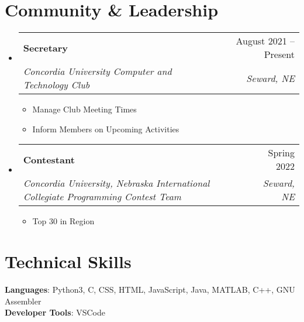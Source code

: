 \documentclass[letterpaper,11pt]{article}
\makeatletter
\newcommand{\resumeItem}[1]{
  \item\small{
    {#1 \vspace{-2pt}}
  }
}
\newcommand{\resumeSubheading}[4]{
  \vspace{-2pt}\item
    \begin{tabular*}{0.97\textwidth}[t]{l@{\extracolsep{\fill}}r}
      \textbf{#1} & #2 \\
      \textit{\small#3} & \textit{\small #4} \\
    \end{tabular*}\vspace{-7pt}
}
\newcommand{\resumeSubHeadingListStart}{\begin{itemize}[leftmargin=0.15in, label={}]}
\newcommand{\resumeSubHeadingListEnd}{\end{itemize}}
\newcommand{\resumeItemListStart}{\begin{itemize}}
\newcommand{\resumeItemListEnd}{\end{itemize}\vspace{-5pt}}
\makeatother
\begin{document}
\section{Community \& Leadership}
\resumeSubHeadingListStart

\resumeSubheading
{Secretary}{August 2021 – Present}
{Concordia University Computer and Technology Club}{Seward, NE}
\resumeItemListStart
\resumeItem{Manage Club Meeting Times}
\resumeItem{Inform Members on Upcoming Activities}
\resumeItemListEnd


\resumeSubheading
{Contestant}{Spring 2022}
{Concordia University, Nebraska International Collegiate Programming Contest Team}{Seward, NE}
\resumeItemListStart
\resumeItem{Top 30 in Region}
\resumeItemListEnd

\resumeSubHeadingListEnd


\hspace{5mm}
\section{Technical Skills}
\begin{itemize}[leftmargin=0.15in, label={}]
  \small{\item{
                \textbf{Languages}{: Python3, C, CSS, HTML, JavaScript, Java, MATLAB, C++, GNU Assembler} \\
                \textbf{Developer Tools}{: VSCode} \\
          }}
\end{itemize}


\end{document}
